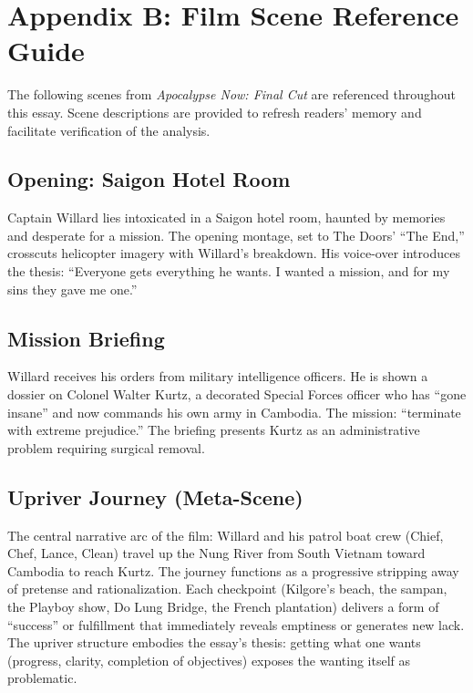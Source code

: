 \section*{Appendix B: Film Scene Reference Guide}
\label{app:scene-reference}

The following scenes from \textit{Apocalypse Now: Final Cut} \parencite{CoppolaApocalypse2019}
are referenced throughout this essay. Scene descriptions are provided to refresh readers'
memory and facilitate verification of the analysis.

\subsection*{Opening: Saigon Hotel Room}
\label{scene:saigon-opening}

Captain Willard lies intoxicated in a Saigon hotel room, haunted by memories and desperate for
a mission. The opening montage, set to The Doors' ``The End,'' crosscuts helicopter imagery
with Willard's breakdown. His voice-over introduces the thesis: ``Everyone gets everything he
wants. I wanted a mission, and for my sins they gave me one.''

\subsection*{Mission Briefing}
\label{scene:briefing}

Willard receives his orders from military intelligence officers. He is shown a dossier on
Colonel Walter Kurtz, a decorated Special Forces officer who has ``gone insane'' and now
commands his own army in Cambodia. The mission: ``terminate with extreme prejudice.'' The
briefing presents Kurtz as an administrative problem requiring surgical removal.

\subsection*{Upriver Journey (Meta-Scene)}
\label{scene:upriver-journey}

The central narrative arc of the film: Willard and his patrol boat crew (Chief, Chef, Lance,
Clean) travel up the Nung River from South Vietnam toward Cambodia to reach Kurtz. The journey
functions as a progressive stripping away of pretense and rationalization. Each checkpoint
(Kilgore's beach, the sampan, the Playboy show, Do Lung Bridge, the French plantation)
delivers a form of ``success'' or fulfillment that immediately reveals emptiness or generates
new lack. The upriver structure embodies the essay's thesis: getting what one wants (progress,
clarity, completion of objectives) exposes the wanting itself as problematic.

